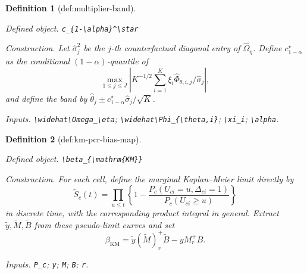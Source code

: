 \documentclass{article}
\newtheorem{definition}{Definition}
\begin{document}
\begin{definition}[def:multiplier-band]\label{def:multiplier-band}
\par\smallskip\noindent\emph{Defined object.} \texttt{c\_\allowbreak{}\{1-\allowbreak{}\textbackslash{}\allowbreak{}alpha\}\allowbreak{}\textasciicircum{}\textbackslash{}\allowbreak{}star}
\par\smallskip\noindent\emph{Construction.} Let \(\widehat\sigma_j^2\) be the \(j\)-th counterfactual diagonal entry of \(\widehat\Omega_\eta\). Define \(c_{1-\alpha}^\star\) as the conditional \((1-\alpha)\)-quantile of \[\max_{1\le j\le J}\left|K^{-1/2}\sum_{i=1}^K\xi_i\widehat\Phi_{\theta,i,j}/\widehat\sigma_j\right|,\] and define the band by \(\widehat\theta_j\pm c_{1-\alpha}^\star\widehat\sigma_j/\sqrt K\).
\par\smallskip\noindent\emph{Inputs.} \texttt{\textbackslash{}\allowbreak{}widehat\textbackslash{}\allowbreak{}Omega\_\allowbreak{}\textbackslash{}\allowbreak{}eta}; \texttt{\textbackslash{}\allowbreak{}widehat\textbackslash{}\allowbreak{}Phi\_\allowbreak{}\{\textbackslash{}\allowbreak{}theta,\allowbreak{}i\}\allowbreak{}}; \texttt{\textbackslash{}\allowbreak{}xi\_\allowbreak{}i}; \texttt{\textbackslash{}\allowbreak{}alpha}.
\end{definition}

\begin{definition}[def:km-pcr-bias-map]\label{def:km-pcr-bias-map}
\par\smallskip\noindent\emph{Defined object.} \texttt{\textbackslash{}\allowbreak{}beta\_\allowbreak{}\{\textbackslash{}\allowbreak{}mathrm\{KM\}\allowbreak{}\}\allowbreak{}}
\par\smallskip\noindent\emph{Construction.} For each cell, define the marginal Kaplan--Meier limit directly by \[\widetilde S_c(t)=\prod_{u\le t}\left\{1-\frac{P_c(U_{ci}=u,\Delta_{ci}=1)}{P_c(U_{ci}\ge u)}\right\}\] in discrete time, with the corresponding product integral in general. Extract \(\widetilde y,\widetilde M,\widetilde B\) from these pseudo-limit curves and set \[\beta_{\mathrm{KM}}=\widetilde y(\widetilde M)_r^+\widetilde B-yM_r^+B.\]
\par\smallskip\noindent\emph{Inputs.} \texttt{P\_\allowbreak{}c}; \texttt{y}; \texttt{M}; \texttt{B}; \texttt{r}.
\end{definition}
\end{document}
